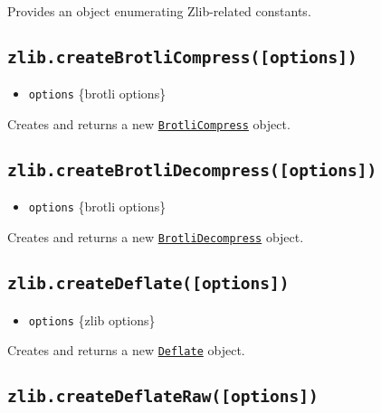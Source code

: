 Provides an object enumerating Zlib-related constants.

\subsection{\texorpdfstring{\texttt{zlib.createBrotliCompress({[}options{]})}}{zlib.createBrotliCompress({[}options{]})}}\label{zlib.createbrotlicompressoptions}

\begin{itemize}
\tightlist
\item
  \texttt{options} \{brotli options\}
\end{itemize}

Creates and returns a new
\hyperref[class-zlibbrotlicompress]{\texttt{BrotliCompress}} object.

\subsection{\texorpdfstring{\texttt{zlib.createBrotliDecompress({[}options{]})}}{zlib.createBrotliDecompress({[}options{]})}}\label{zlib.createbrotlidecompressoptions}

\begin{itemize}
\tightlist
\item
  \texttt{options} \{brotli options\}
\end{itemize}

Creates and returns a new
\hyperref[class-zlibbrotlidecompress]{\texttt{BrotliDecompress}} object.

\subsection{\texorpdfstring{\texttt{zlib.createDeflate({[}options{]})}}{zlib.createDeflate({[}options{]})}}\label{zlib.createdeflateoptions}

\begin{itemize}
\tightlist
\item
  \texttt{options} \{zlib options\}
\end{itemize}

Creates and returns a new \hyperref[class-zlibdeflate]{\texttt{Deflate}}
object.

\subsection{\texorpdfstring{\texttt{zlib.createDeflateRaw({[}options{]})}}{zlib.createDeflateRaw({[}options{]})}}\label{zlib.createdeflaterawoptions}

